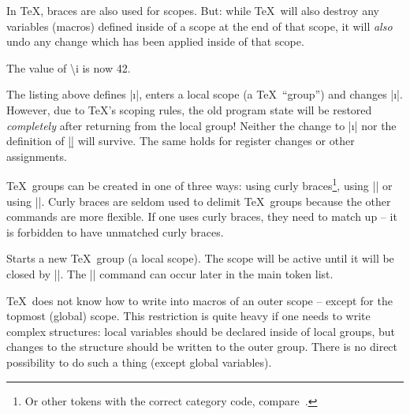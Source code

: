 \documentclass[a4paper]{ltxdoc}
\begin{document}
In \TeX, braces are also used for scopes. But: while \TeX\ will also destroy any variables (macros) defined inside of a scope at the end of that scope, it will \emph{also} undo any change which has been applied inside of that scope.
\begin{codeexample}[]
\def\i{42}
{
	\def\i{43}
	\def\b{2}
}
The value of \textbackslash i is now \i.
\end{codeexample}
\noindent The listing above defines |\i|, enters a local scope (a \TeX\ ``group'') and changes |\i|. However, due to \TeX's scoping rules, the old program state will be restored \emph{completely} after returning from the local group! Neither the change to |\i| nor the definition of |\b| will survive. The same holds for register changes or other assignments.

\TeX\ groups can be created in one of three ways: using curly braces\footnote{Or other tokens with the correct category code, compare~\cite{texbook}.}, using |\begingroup| or using |\bgroup|. Curly braces are seldom used to delimit \TeX\ groups because the other commands are more flexible. If one uses curly braces, they need to match up -- it is forbidden to have unmatched curly braces.
\begin{command}{\begingroup}
	Starts a new \TeX\ group (a local scope). The scope will be active until it will be closed by |\endgroup|. The |\endgroup| command can occur later in the main token list.
\end{command}

\TeX\ does not know how to write into macros of an outer scope -- except for the topmost (global) scope. This restriction is quite heavy if one needs to write complex structures: local variables should be declared inside of local groups, but changes to the structure should be written to the outer group. There is no direct possibility to do such a thing (except global variables).
\end{document}
